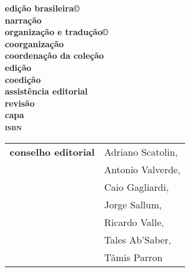 \newcommand{\linha}[2]{\ifdef{#2}{\linhalayout{#1}{#2}}{}}

\begingroup\tiny
\parindent=0cm
\thispagestyle{empty}

\textbf{edição brasileira©}\\
\textbf{narração}\\
\textbf{organização e tradução©}\\
\textbf{coorganização}\\


\textbf{coordenação da coleção}\\
\textbf{edição}\\
\textbf{coedição}\\
\textbf{assistência editorial}\\
\textbf{revisão}\\				
\textbf{capa}\\

\textbf{\textsc{isbn}}

\hspace{-5pt}\begin{tabular}{ll}
\textbf{conselho editorial} & Adriano Scatolin,  \\
							& Antonio Valverde,  \\
							& Caio Gagliardi,    \\
							& Jorge Sallum,      \\
							& Ricardo Valle,     \\
							& Tales Ab'Saber,    \\
							& Tâmis Parron      
\end{tabular}
 
